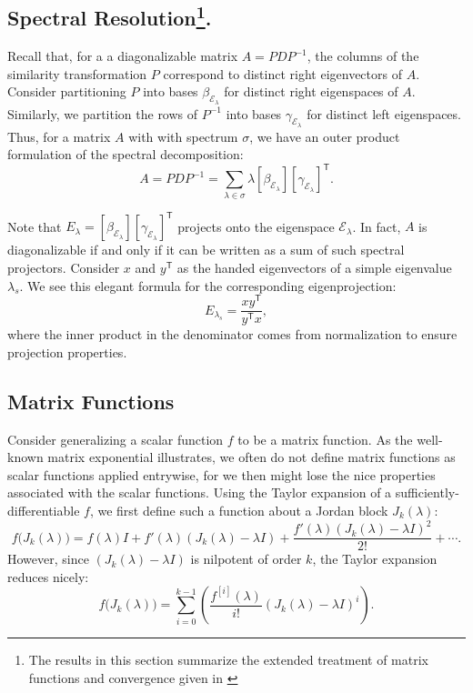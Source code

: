 \documentclass[12pt]{article}
\newcommand{\transpose}[1]{#1^{\mathsf{T}}}
\newcommand{\inverse}[1]{#1^{-1}}
\newcommand{\parens}[1]{ \left( #1 \right) }
\begin{document}
\subsection{Spectral Resolution\protect\footnote{The results in this section
    summarize the extended treatment of matrix functions and convergence given
    in \cite{meyerMatrixAnalysisApplied2000}}.}
Recall that, for a a diagonalizable matrix $A=PD\inverse{P}$, the columns of the
similarity transformation $P$ correspond to distinct right eigenvectors of $A$.
Consider partitioning $P$ into bases $\beta_{\mathcal{E}_\lambda}$ for distinct
right eigenspaces of $A$. Similarly, we partition the rows of $\inverse{P}$ into
bases $\gamma_{\mathcal{E}_\lambda}$ for distinct left eigenspaces. Thus, for a
matrix $A$ with with spectrum $\sigma$, we have an outer product formulation of
the spectral decomposition:
\begin{equation}
  \label{eqn:spectral_decomposition}
  A = PD\inverse{P} = \sum_{\lambda\in\sigma}{\lambda [\beta_{\mathcal{E}_\lambda}]\transpose{[\gamma_{\mathcal{E}_\lambda}]}}.
\end{equation}

Note that
$E_\lambda =
[\beta_{\mathcal{E}_\lambda}]\transpose{[\gamma_{\mathcal{E}_\lambda}]}$
projects onto the eigenspace $\mathcal{E}_\lambda$. In fact, $A$ is
diagonalizable if and only if it can be written as a sum of such spectral
projectors. Consider $x$ and $\transpose{y}$ as the handed eigenvectors of a
simple eigenvalue $\lambda_s$. We see this elegant formula for the corresponding
eigenprojection:
\begin{equation}
  \label{eqn:simple_eigenprojection}
  E_{\lambda_s} = \frac{x \transpose{y}}{\transpose{y} x},
\end{equation}
where the inner product in the denominator comes from normalization to ensure projection properties.


\subsection{Matrix Functions}
Consider generalizing a scalar function $f$ to be a matrix function. As the
well-known matrix exponential illustrates, we often do not define matrix
functions as scalar functions applied entrywise, for we then might lose the nice
properties associated with the scalar functions. Using the Taylor expansion of a
sufficiently-differentiable $f$, we first define such a function about a Jordan
block $J_k(\lambda)$:
\begin{equation*}
  f\big( J_k(\lambda) \big)=f(\lambda)I + f'(\lambda)(J_k(\lambda) - \lambda I) + \frac{f'(\lambda)(J_k(\lambda) - \lambda I)^2}{2!} + \cdots.
\end{equation*}
However, since $(J_k(\lambda) - \lambda I)$ is nilpotent of order $k$, the
Taylor expansion reduces nicely:
\begin{equation}
  \label{eqn:f_jordan_block}
  f\big( J_k(\lambda) \big) = \sum_{i=0}^{k - 1}\parens{\frac{f^{[i]}(\lambda)}{i!} (J_k(\lambda) - \lambda I)^i}.
\end{equation}
\end{document}
